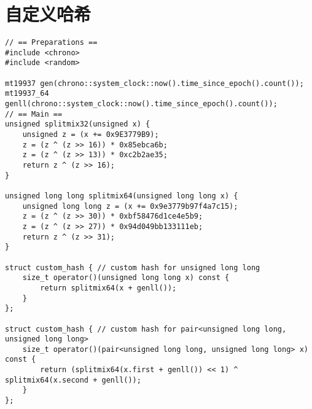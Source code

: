 \section{自定义哈希}

\begin{verbatim}
// == Preparations ==
#include <chrono>
#include <random>

mt19937 gen(chrono::system_clock::now().time_since_epoch().count());
mt19937_64 genll(chrono::system_clock::now().time_since_epoch().count());
// == Main ==
unsigned splitmix32(unsigned x) {
    unsigned z = (x += 0x9E3779B9);
    z = (z ^ (z >> 16)) * 0x85ebca6b;
    z = (z ^ (z >> 13)) * 0xc2b2ae35;
    return z ^ (z >> 16);
}

unsigned long long splitmix64(unsigned long long x) {
    unsigned long long z = (x += 0x9e3779b97f4a7c15);
    z = (z ^ (z >> 30)) * 0xbf58476d1ce4e5b9;
    z = (z ^ (z >> 27)) * 0x94d049bb133111eb;
    return z ^ (z >> 31);
}

struct custom_hash { // custom hash for unsigned long long
    size_t operator()(unsigned long long x) const {
        return splitmix64(x + genll());
    }
};

struct custom_hash { // custom hash for pair<unsigned long long, unsigned long long>
    size_t operator()(pair<unsigned long long, unsigned long long> x) const {
        return (splitmix64(x.first + genll()) << 1) ^ splitmix64(x.second + genll());
    }
};
\end{verbatim}